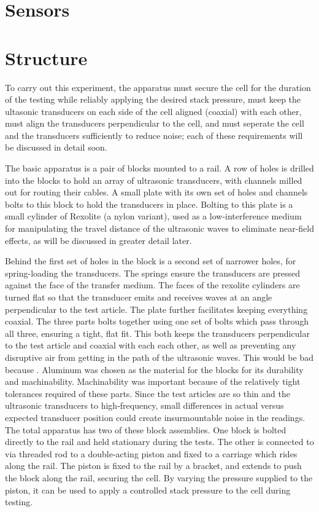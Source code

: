 \section{Sensors}

\section{Structure}
To carry out this experiment, the apparatus must secure the cell for the duration of the testing while reliably applying the desired stack pressure, must keep the ultasonic transducers on each side of the cell aligned (coaxial) with each other, must align the transducers perpendicular to the cell, and must seperate the cell and the transducers sufficiently to reduce noise; each of these requirements will be discussed in detail soon.

The basic apparatus is a pair of blocks mounted to a rail. A row of holes is drilled into the blocks to hold an array of ultrasonic transducers, with channels milled out for routing their cables. A small plate with its own set of holes and channels bolts to this block to hold the transducers in place. Bolting to this plate is a small cylinder of Rexolite (a nylon variant), used as a low-interference medium for manipulating the travel distance of the ultrasonic waves to eliminate near-field effects, as will be discussed in greater detail later.

Behind the first set of holes in the block is a second set of narrower holes, for spring-loading the transducers. The springs ensure the transducers are pressed against the face of the transfer medium. The faces of the rexolite cylinders are turned flat so that the transducer emits and receives waves at an angle perpendicular to the test article. The plate further facilitates keeping everything coaxial. The three parts bolts together using one set of bolts which pass through all three, ensuring a tight, flat fit. This both keeps the transducers perpendicular to the test article and coaxial with each each other, as well as preventing any disruptive air from getting in the path of the ultrasonic waves. This would be bad because . Aluminum was chosen as the material for the blocks for its durability and machinability. Machinability was important because of the relatively tight tolerances required of these parts. Since the test articles are so thin and the ultrasonic transducers to high-frequency, small differences in actual versus expected transducer position could create insurmountable noise in the readings. The total apparatus has two of these block assemblies. One block is bolted directly to the rail and held stationary during the tests. The other is connected to via threaded rod to a double-acting piston and fixed to a carriage which rides along the rail. The piston is fixed to the rail by a bracket, and extends to push the block along the rail, securing the cell. By varying the pressure supplied to the piston, it can be used to apply a controlled stack pressure to the cell during testing.

